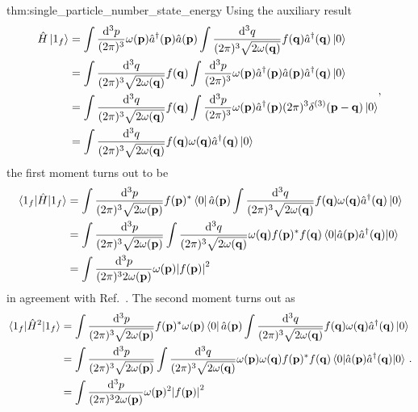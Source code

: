 \begin{delayedproof}{thm:single_particle_number_state_energy}
	Using the auxiliary result
	\begin{equation*}
		\begin{split}
			\hat{H}
			\ket{1_f}
			&=
			\int\frac{\dd[3]{p}}{(2\pi)^3}
			\omega(\vb{p})
			\hat{a}^\dagger(\vb{p})
			\hat{a}(\vb{p})
			\int\frac{\dd[3]{q}}{(2\pi)^3\sqrt{2\omega(\vb{q})}}
			f(\vb{q})
			\hat{a}^\dagger(\vb{q})
			\ket{0}
			\\
			&=
			\int\frac{\dd[3]{q}}{(2\pi)^3\sqrt{2\omega(\vb{q})}}
			f(\vb{q})
			\int\frac{\dd[3]{p}}{(2\pi)^3}
			\omega(\vb{p})
			\hat{a}^\dagger(\vb{p})
			\hat{a}(\vb{p})
			\hat{a}^\dagger(\vb{q})
			\ket{0}
			\\
			&=
			\int\frac{\dd[3]{q}}{(2\pi)^3\sqrt{2\omega(\vb{q})}}
			f(\vb{q})
			\int\frac{\dd[3]{p}}{(2\pi)^3}
			\omega(\vb{p})
			\hat{a}^\dagger(\vb{p})
			(2\pi)^3
			\delta^{(3)}(\vb{p}-\vb{q})
			\ket{0}
			\\
			&=
			\int\frac{\dd[3]{q}}{(2\pi)^3\sqrt{2\omega(\vb{q})}}
			f(\vb{q})
			\omega(\vb{q})
			\hat{a}^\dagger(\vb{q})
			\ket{0}
		\end{split}
		,
	\end{equation*}
	the first moment turns out to be
	\begin{equation*}
		\begin{split}
			\expval{\hat{H}}{1_f}
			&=
			\int\frac{\dd[3]{p}}{(2\pi)^3\sqrt{2\omega(\vb{p})}}
			f(\vb{p})^*
			\bra{0}
			\hat{a}(\vb{p})
			\int\frac{\dd[3]{q}}{(2\pi)^3\sqrt{2\omega(\vb{q})}}
			f(\vb{q})
			\omega(\vb{q})
			\hat{a}^\dagger(\vb{q})
			\ket{0}
			\\
			&=
			\int\frac{\dd[3]{p}}{(2\pi)^3\sqrt{2\omega(\vb{p})}}
			\int\frac{\dd[3]{q}}{(2\pi)^3\sqrt{2\omega(\vb{q})}}
			\omega(\vb{q})
			f(\vb{p})^*
			f(\vb{q})
			\expval{
				\hat{a}(\vb{p})
				\hat{a}^\dagger(\vb{q})
			}{0}
			\\
			&=
			\int\frac{\dd[3]{p}}{(2\pi)^32\omega(\vb{p})}
			\omega(\vb{p})
			\abs{f(\vb{p})}^2
		\end{split}
	\end{equation*}
	in agreement with Ref.~\cite[eqs.~10 and 11]{Naumov2013}.
	The second moment turns out as
	\begin{equation*}
		\begin{split}
			\expval{\hat{H}^2}{1_f}
			&=
			\int\frac{\dd[3]{p}}{(2\pi)^3\sqrt{2\omega(\vb{p})}}
			f(\vb{p})^*
			\omega(\vb{p})
			\bra{0}
			\hat{a}(\vb{p})
			\int\frac{\dd[3]{q}}{(2\pi)^3\sqrt{2\omega(\vb{q})}}
			f(\vb{q})
			\omega(\vb{q})
			\hat{a}^\dagger(\vb{q})
			\ket{0}
			\\
			&=
			\int\frac{\dd[3]{p}}{(2\pi)^3\sqrt{2\omega(\vb{p})}}
			\int\frac{\dd[3]{q}}{(2\pi)^3\sqrt{2\omega(\vb{q})}}
			\omega(\vb{p})
			\omega(\vb{q})
			f(\vb{p})^*
			f(\vb{q})
			\expval{
				\hat{a}(\vb{p})
				\hat{a}^\dagger(\vb{q})
			}{0}
			\\
			&=
			\int\frac{\dd[3]{p}}{(2\pi)^32\omega(\vb{p})}
			\omega(\vb{p})^2
			\abs{f(\vb{p})}^2
		\end{split}
		.
	\end{equation*}
\end{delayedproof}
